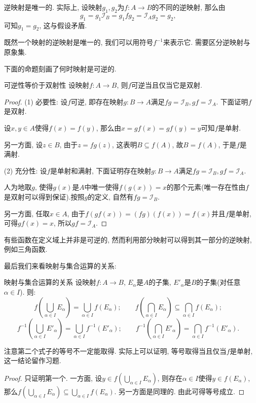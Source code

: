 逆映射是唯一的. 实际上, 设映射$g_1, g_2$为$f: A \to B$的不同的逆映射, 那么由$$g_1 = g_1\mathcal{I}_B = g_1fg_2 = \mathcal{I}_Ag_2 = g_2, $$
可知$g_1=g_2$, 这与假设矛盾.

既然一个映射的逆映射是唯一的, 我们可以用符号$f^{-1}$来表示它. 需要区分逆映射与原象集.

下面的命题刻画了何时映射是可逆的.

\begin{proposition}{可逆性等价于双射性}
	设映射$f: A \to B$, 则$f$可逆当且仅当它是双射.
\end{proposition}
\begin{proof}
	(1) 必要性: 设$f$可逆, 即存在映射$g: B \to A$满足$fg=\mathcal{I}_B, gf=\mathcal{I}_A$. 下面证明$f$是双射. 
	
	设$x, y \in A$使得$f(x)=f(y)$, 那么由$x=gf(x)=gf(y)=y$可知$f$是单射. 
	
	另一方面, 设$z \in B$, 由于$z=fg(z)$, 这表明$B \subseteq f(A)$, 故$B = f(A)$, 于是$f$是满射. 
	
	(2) 充分性: 设$f$是单射和满射, 下面证明存在映射$g: B \to A$满足$fg=\mathcal{I}_B, gf=\mathcal{I}_A$. 
	
	人为地取$g$, 使得$g(x)$是$A$中唯一使得$f(g(x))=x$的那个元素(唯一存在性由$f$是双射可以得到保证).按照$g$的定义, 自然有$fg=\mathcal{I}_B$. 
	
	另一方面, 任取$x \in A$, 由于$f(gf(x)) = (fg)(f(x)) = f(x)$并且$f$是单射, 可得$gf(x)=x$, 所以$gf=\mathcal{I}_A$.
\end{proof}

有些函数在定义域上并非是可逆的, 然而利用部分映射可以得到其一部分的逆映射, 例如三角函数.

最后我们来看映射与集合运算的关系: 

\begin{proposition}{映射与集合运算的关系}
	设映射$f:A \to B$, $E_{\alpha}$是$A$的子集, $E'_{\alpha}$是$B$的子集(对任意$\alpha \in I$). 则: 
	$$f \left( \bigcup_{\alpha \in I} E_{\alpha} \right) = \bigcup_{\alpha \in I} f(E_{\alpha});\qquad f \left( \bigcap_{\alpha \in I} E_{\alpha} \right) \subseteq \bigcap_{\alpha \in I} f(E_{\alpha}); $$
	$$f^{-1} \left( \bigcup_{\alpha \in I} E'_{\alpha} \right) = \bigcup_{\alpha \in I} f^{-1}(E'_{\alpha});\qquad f^{-1} \left( \bigcap_{\alpha \in I} E'_{\alpha} \right) = \bigcap_{\alpha \in I} f^{-1}(E'_{\alpha}). $$
\end{proposition}
\begin{remark}
	注意第二个式子的等号不一定能取得. 实际上可以证明, 等号取得当且仅当$f$是单射, 这一结论留作习题. 
\end{remark}
\begin{proof}
	只证明第一个. 一方面, 设$y \in f(\bigcup_{\alpha \in I} E_{\alpha})$, 则存在$\alpha \in I$使得$y \in f(E_{\alpha})$, 那么$f(\bigcup_{\alpha \in I} E_{\alpha}) \subseteq \bigcup_{\alpha \in I} f(E_{\alpha})$. 另一方面是同理的. 由此可得等号成立. 
\end{proof}

